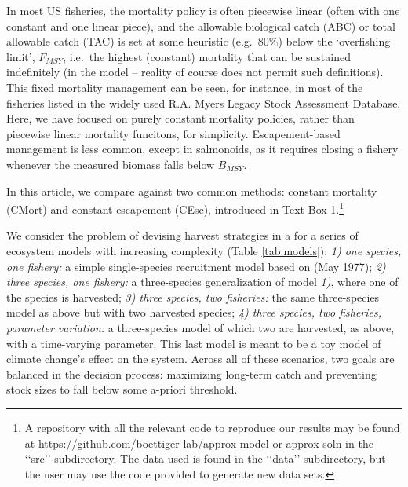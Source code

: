 \documentclass{article}
\begin{document}
In most US fisheries, the mortality policy is often piecewise linear
(often with one constant and one linear piece), and the allowable
biological catch (ABC) or total allowable catch (TAC) is set at some
heuristic (e.g.~80\%) below the `overfishing limit', \(F_{MSY}\),
i.e.~the highest (constant) mortality that can be sustained indefinitely
(in the model -- reality of course does not permit such definitions).
This fixed mortality management can be seen, for instance, in most of
the fisheries listed in the widely used R.A. Myers Legacy Stock
Assessment Database. Here, we have focused on purely constant mortality
policies, rather than piecewise linear mortality funcitons, for
simplicity. Escapement-based management is less common, except in
salmonoids, as it requires closing a fishery whenever the measured
biomass falls below \(B_{MSY}\).

In this article, we compare against two common methods: constant
mortality (CMort) and constant escapement (CEsc), introduced in Text Box
1.\footnote{
A repository with all the relevant code to reproduce our results may be found at \url{https://github.com/boettiger-lab/approx-model-or-approx-soln} in the ‘‘src’’ subdirectory. 
The data used is found in the ‘‘data’’ subdirectory, but the user may use the code provided to generate new data sets.
}

We consider the problem of devising harvest strategies in a for a series
of ecosystem models with increasing complexity (Table \ref{tab:models}):
\emph{1) one species, one fishery:} a simple single-species recruitment
model based on (May 1977); \emph{2) three species, one fishery:} a
three-species generalization of model \emph{1)}, where one of the
species is harvested; \emph{3) three species, two fisheries:} the same
three-species model as above but with two harvested species; \emph{4)
three species, two fisheries, parameter variation:} a three-species
model of which two are harvested, as above, with a time-varying
parameter. This last model is meant to be a toy model of climate
change's effect on the system. Across all of these scenarios, two goals
are balanced in the decision process: maximizing long-term catch and
preventing stock sizes to fall below some a-priori threshold.
\end{document}
